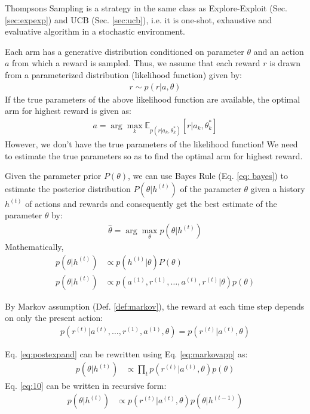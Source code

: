 \documentclass[11pt]{article}
\begin{document}
Thompsons Sampling \cite{10.1093/biomet/25.3-4.285} is a strategy in the same class as Explore-Exploit (Sec. \ref{sec:expexp}) and UCB (Sec. \ref{sec:ucb}), i.e. it is one-shot, exhaustive and evaluative algorithm in a stochastic environment.

Each arm has a generative distribution conditioned on parameter $\theta$ and an action $a$ from which a reward is sampled. Thus, we assume that each reward $r$ is drawn from a parameterized distribution (likelihood function) given by:
\begin{align}
    r \sim p(r|a,\theta)
\end{align}
If the true parameters of the above likelihood function are available, the optimal arm for highest reward is given as:
\begin{align}
    a = \arg\max\limits_k \mathbb{E}_{p(r|a_k, \theta_k^*)}[r|a_k, \theta_k^*]
    \label{eq:5}
\end{align}
However, we don't have the true parameters of the likelihood function! We need to estimate the true parameters so as to find the optimal arm for highest reward.  

Given the parameter prior $P(\theta)$, we can use Bayes Rule (Eq. \ref{eq: bayes}) to estimate the posterior distribution $P(\theta | h^{(t)})$ of the parameter $\theta$ given a history $h^{(t)}$ of actions and rewards and consequently get the best estimate of the parameter $\theta$ by:
\begin{align}
    \hat{\theta} = \arg\max\limits_\theta p(\theta|h^{(t)})
    \label{eq:6}
\end{align}
Mathematically, 
\begin{align}
    p(\theta | h^{(t)}) &\propto  p(h^{(t)} | \theta) P(\theta)\\
    p(\theta | h^{(t)}) &\propto  p(a^{(1)}, r^{(1)}, \ldots, a^{(t)}, r^{(t)} | \theta) p(\theta)
    \label{eq:postexpand}
\end{align}

By Markov assumption (Def. \ref{def:markov}), the reward at each time step depends on only the present action:
\begin{align}
    p(r^{(t)}|a^{(t)}, \ldots, r^{(1)}, a^{(1)}, \theta) =  p(r^{(t)}|a^{(t)}, \theta)
    \label{eq:markovapp}
\end{align}

Eq. \ref{eq:postexpand} can be rewritten using Eq. \ref{eq:markovapp} as:
\begin{align}
    p(\theta | h^{(t)}) &\propto  \prod\limits_t p(r^{(t)}|a^{(t)}, \theta) p(\theta)
    \label{eq:10}
\end{align}
Eq. \ref{eq:10} can be written in recursive form:
\begin{align}
    p(\theta | h^{(t)}) &\propto  p(r^{(t)}|a^{(t)}, \theta) p(\theta|h^{(t-1)})
    \label{eq:11}
\end{align}
\end{document}

